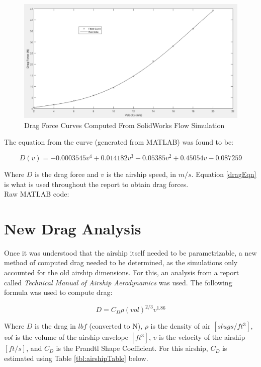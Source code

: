 \documentclass[../main.tex]{subfiles}
\begin{document}
\begin{figure}[H]
	\centering
	\includegraphics[width=\linewidth]{img/drag/curveFit.PNG}
	\caption{Drag Force Curves Computed From SolidWorks Flow Simulation}
	\label{fig:curveFit}
\end{figure}

The equation from the curve (generated from MATLAB) was found to be:

\begin{equation} \label{dragEqn}
	D(v) = -0.0003545v^4 + 0.014182v^3 -0.05385v^2 + 0.45054v -0.087259
\end{equation}

Where $ D $ is the drag force and $ v $ is the airship speed, in $m/s$. Equation \ref{dragEqn} is what is used throughout the report to obtain drag forces.\\

Raw MATLAB code:



\section{New Drag Analysis}

Once it was understood that the airship itself needed to be parametrizable, a new method of computed drag needed to be determined, as the simulations only accounted for the old airship dimensions. For this, an analysis from a report called \textit{Technical Manual of Airship Aerodynamics} \cite{airshipAerodynamics} was used. The following formula was used to compute drag:

\begin{equation}
		D = C_D\rho (vol)^{2/3}v^{1.86}
\end{equation}

Where $D$ is the drag in $lbf$ (converted to N), $ \rho $ is the density of air $[slugs/ft^3]$, $vol$ is the volume of the airship envelope $[ft^3]$, $v$ is the velocity of the airship $[ft/s]$, and $C_D$ is the Prandtl Shape Coefficient. For this airship, $C_D$ is estimated using Table \ref{tbl:airshipTable} below.
\end{document}
